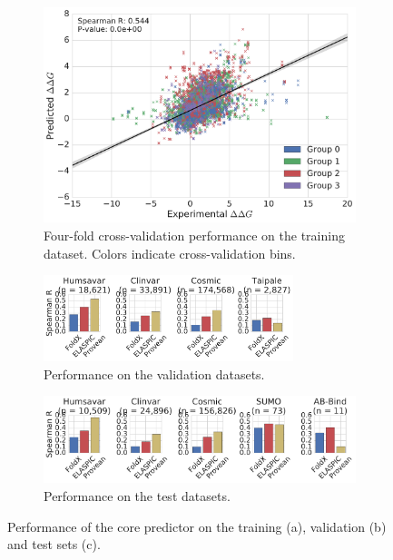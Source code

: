 \begin{figure}[!htb]
	\centering
	\begin{subfigure}[b]{1.0\textwidth}
		\centering
		\includegraphics[width=0.6\linewidth]{static/elaspic_training_set/validation/crossvalidation_performance_core.pdf}
		\caption{Four-fold cross-validation performance on the training dataset. Colors indicate cross-validation bins.}
		\vspace*{10mm}
	\end{subfigure}
	\begin{subfigure}[b]{1.0\textwidth}
		\centering
		\includegraphics[width=0.8\textwidth]{static/elaspic_training_set/validation/validation_performance_core.pdf}
		\caption{Performance on the validation datasets.}
		\vspace*{10mm}
	\end{subfigure}
	\begin{subfigure}[b]{1.0\textwidth}
		\centering
		\includegraphics[width=1.0\textwidth]{static/elaspic_training_set/validation/test_performance_core.pdf}
		\caption{Performance on the test datasets.}
	\end{subfigure}
	\caption[Core predictor validation.]{Performance of the core predictor on the training (a), validation (b) and test sets (c).}
\end{figure}



